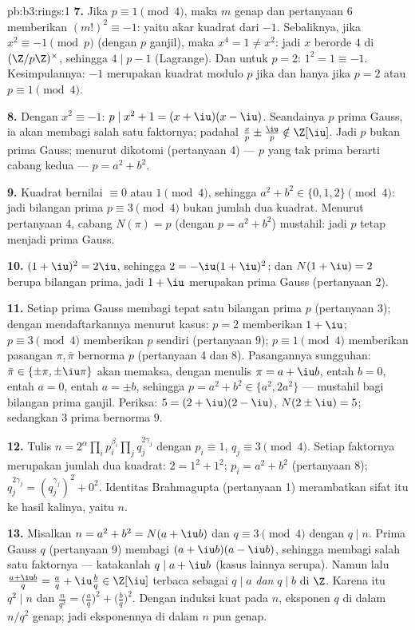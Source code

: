 \begin{solution}{pb:b3:rings:1}
\textbf{7.} Jika $p \equiv 1 \pmod 4$, maka $m$ genap dan pertanyaan 6
memberikan $(m!)^2 \equiv -1$: yaitu akar kuadrat dari $-1$. Sebaliknya, jika
$x^2 \equiv -1 \pmod p$ (dengan $p$ ganjil), maka $x^4 = 1 \neq x^2$: jadi $x$
berorde $4$ di $(\Z/p\Z)^\times$, sehingga $4 \mid p - 1$ (Lagrange).
Dan untuk $p = 2$: $1^2 = 1 \equiv -1$. Kesimpulannya: $-1$ merupakan kuadrat
modulo $p$ jika dan hanya jika $p = 2$ atau $p \equiv 1 \pmod 4$.

\textbf{8.} Dengan $x^2 \equiv -1$: $p \mid x^2 + 1 = (x + \iu)(x -
\iu)$. Seandainya $p$ prima Gauss, ia akan membagi salah satu faktornya; padahal
$\frac xp \pm \frac \iu p \notin \Z[\iu]$. Jadi $p$ bukan
prima Gauss; menurut dikotomi (pertanyaan 4) --- $p$ yang tak prima
berarti cabang kedua --- $p = a^2 + b^2$.

\textbf{9.} Kuadrat bernilai $\equiv 0$ atau $1 \pmod 4$, sehingga $a^2 + b^2
\in \{0, 1, 2\} \pmod 4$: jadi bilangan prima $p \equiv 3 \pmod 4$ bukan
jumlah dua kuadrat. Menurut pertanyaan 4, cabang $N(\pi) = p$ (dengan $p =
a^2+b^2$) mustahil: jadi $p$ tetap menjadi prima Gauss.

\textbf{10.} $(1 + \iu)^2 = 2\iu$, sehingga $2 = -\iu(1 + \iu)^2$; dan
$N(1 + \iu) = 2$ berupa bilangan prima, jadi $1 + \iu$ merupakan prima Gauss
(pertanyaan 2).

\textbf{11.} Setiap prima Gauss membagi tepat satu bilangan
prima $p$ (pertanyaan 3); dengan mendaftarkannya menurut kasus: $p = 2$ memberikan
 $1 + \iu$; $p \equiv 3 \pmod 4$ memberikan $p$ sendiri
(pertanyaan 9); $p \equiv 1 \pmod 4$ memberikan pasangan $\pi, \bar\pi$
bernorma $p$ (pertanyaan 4 dan 8). Pasangannya sungguhan: $\bar\pi \in
\{\pm\pi, \pm\iu\pi\}$ akan memaksa, dengan menulis $\pi = a + \iu b$,
entah $b = 0$, entah $a = 0$, entah $a = \pm b$, sehingga $p = a^2 + b^2 \in
\{a^2, 2a^2\}$ --- mustahil bagi bilangan prima ganjil. Periksa:
$5 = (2 + \iu)(2 - \iu)$, $N(2\pm\iu) = 5$; sedangkan $3$ prima bernorma
$9$.

\textbf{12.} Tulis $n = 2^{\alpha}\prod_i p_i^{\beta_i} \prod_j
q_j^{2\gamma_j}$ dengan $p_i \equiv 1$, $q_j \equiv 3 \pmod 4$.
Setiap faktornya merupakan jumlah dua kuadrat: $2 = 1^2 + 1^2$; $p_i = a^2
+ b^2$ (pertanyaan 8); $q_j^{2\gamma_j} = (q_j^{\gamma_j})^2 +
0^2$. Identitas Brahmagupta (pertanyaan 1) merambatkan
sifat itu ke hasil kalinya, yaitu $n$.

\textbf{13.} Misalkan $n = a^2 + b^2 = N(a + \iu b)$ dan $q \equiv 3
\pmod 4$ dengan $q \mid n$. Prima Gauss $q$ (pertanyaan 9) membagi
$(a + \iu b)(a - \iu b)$, sehingga membagi salah satu faktornya --- katakanlah $q
\mid a + \iu b$ (kasus lainnya serupa). Namun lalu $\frac{a +
\iu b}{q} = \frac aq + \iu \frac bq \in \Z[\iu]$ terbaca sebagai $q
\mid a$ \emph{dan} $q \mid b$ di $\Z$. Karena itu $q^2 \mid n$ dan
$\frac n{q^2} =
\bigl(\frac aq\bigr)^2 + \bigl(\frac bq\bigr)^2$. Dengan induksi kuat
pada $n$, eksponen $q$ di dalam $n/q^2$ genap; jadi eksponennya di dalam
$n$ pun genap.


\end{solution}
